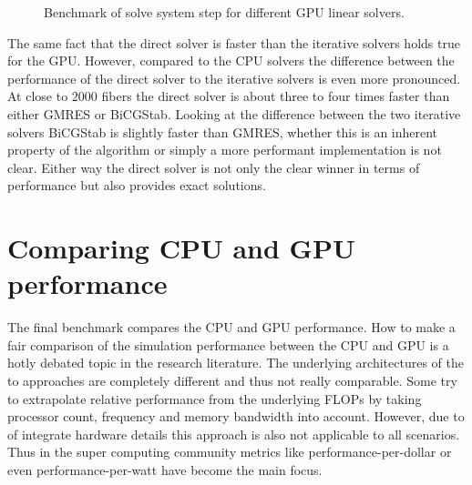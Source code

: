 \documentclass[a4paper,11pt]{kth-mag}
\begin{document}
\begin{figure}[!htbp]
  \centering
  \caption{Benchmark of solve system step for different GPU linear solvers.}
  \label{fig:bench_cuda_solvers}
\end{figure}

The same fact that the direct solver is faster than the iterative solvers holds true for the GPU. However, compared to the CPU solvers the difference between the performance of the direct solver to the iterative solvers is even more pronounced. At close to $2000$ fibers the direct solver is about three to four times faster than either GMRES or BiCGStab. Looking at the difference between the two iterative solvers BiCGStab is slightly faster than GMRES, whether this is an inherent property of the algorithm or simply a more performant implementation is not clear. Either way the direct solver is not only the clear winner in terms of performance but also provides exact solutions.

\section{Comparing CPU and GPU performance}

The final benchmark compares the CPU and GPU performance. How to make a fair comparison of the simulation performance between the CPU and GPU is a hotly debated topic in the research literature. The underlying architectures of the to approaches are completely different and thus not really comparable. Some try to extrapolate relative performance from the underlying FLOPs by taking processor count, frequency and memory bandwidth into account. However, due to of integrate hardware details this approach is also not applicable to all scenarios. Thus in the super computing community metrics like performance-per-dollar or even performance-per-watt have become the main focus.
\end{document}
